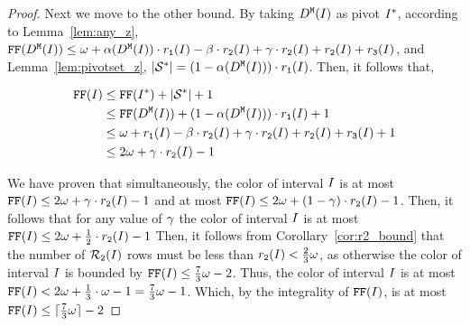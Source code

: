 {\begin{proof}
    Next we move to the other bound.
    By taking $D^\texttt{M}(I)$ as pivot $I^*$, according to Lemma~\ref{lem:any_z}, $\text{\texttt{FF}}(D^\texttt{M}(I)) \leq \omega + \alpha(D^\texttt{M}(I)) \cdot r_\texttt{1}(I) - \beta  \cdot r_\texttt{2}(I) + \gamma  \cdot r_\texttt{2}(I) + r_\texttt{2}(I) + r_\texttt{3}(I)$, and Lemma~\ref{lem:pivotset_z}, $|\mathcal{S}^*| = (1 - \alpha(D^\texttt{M}(I)))\cdot r_\texttt{1}(I)$.
    Then, it follows that,

    \begin{align*}
        \ffc(\x) &\leq \ffc(\pivot) + |\pivotset| + 1\\
        &\leq \ffc(\z) + (1 - \alp(\z)) \cdot \nrows{1}{\x} + 1 \\
        &\leq \omega + \nrows{1}{\x} - \bet  \cdot \nrows{2}{\x} + \gam  \cdot \nrows{2}{\x} + \nrows{2}{\x} + \nrows{3}{\x} + 1\\ 
        &\leq 2\omega + \gam  \cdot \nrows{2}{\x} - 1 %
    \end{align*}

    We have proven that simultaneously, the color of interval $I$ is at most $\text{\texttt{FF}}(I) \leq 2\omega + \gamma  \cdot r_\texttt{2}(I) - 1$ and at most $\text{\texttt{FF}}(I) \leq 2\omega + (1 - \gamma ) \cdot r_\texttt{2}(I) - 1$.
    Then, it follows that for any value of $\gamma $ the color of interval $I$ is at most $\text{\texttt{FF}}(I) \leq 2\omega + \frac{1}{2}\cdot r_\texttt{2}(I) - 1$
    Then, it follows from Corollary~\ref{cor:r2_bound} that the number of $\mathcal{R}_\texttt{2}(I)$ rows must be less than $r_\texttt{2}(I)  < \frac{2}{3}\omega$, as otherwise the color of interval $I$ is bounded by $\text{\texttt{FF}}(I) \leq \frac{7}{3} \omega - 2$.
    Thus, the color of interval $I$ is at most $\text{\texttt{FF}}(I) < 2\omega + \frac{1}{3}\cdot \omega - 1 = \frac{7}{3}\omega - 1$.
    Which, by the integrality of $\text{\texttt{FF}}(I)$, is at most $\text{\texttt{FF}}(I) \leq \lceil \frac{7}{3}\omega \rceil - 2$  
\end{proof}
}